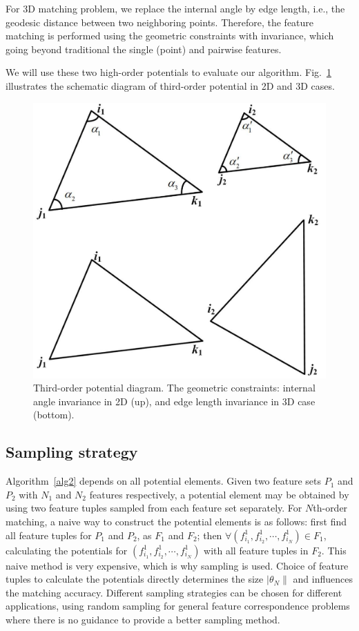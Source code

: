 For 3D matching problem, we replace the internal angle by edge length, i.e., the geodesic distance between two neighboring points. 
Therefore, the feature matching is performed using the geometric constraints with invariance, 
which going beyond traditional the single (point) and pairwise features.

We will use these two high-order potentials to evaluate our algorithm.
Fig.~\ref{fig:TO} illustrates the schematic diagram of third-order potential in 2D and 3D cases.

\begin{figure}
\centering
  \includegraphics[width=0.7\linewidth]{thirdorderpotentials.pdf}
  \caption{Third-order potential diagram. The geometric constraints: internal angle invariance in 2D (up), and edge length invariance in 3D case (bottom).}
\label{fig:TO}
\end{figure}

\subsection{Sampling strategy}
\label{subsec:sampling}

Algorithm~\ref{alg2} depends on all potential elements.
Given two feature sets $P_1$ and $P_2$ with $N_1$ and $N_2$ features respectively,
a potential element may be obtained by using two feature tuples sampled from each feature set separately.
For $N$th-order matching, a naive way to construct the potential elements is as follows:
first find all feature tuples for $P_1$ and $P_2$, as $F_1$ and $F_2$; then $\forall (f_{i_1}^1, f_{i_2}^1, \cdots, f_{i_N}^1)\in F_1$,
calculating the potentials for $(f_{i_1}^1, f_{i_2}^1, \cdots, f_{i_N}^1)$ with all feature tuples in $F_2$.
This naive method is very expensive, which is why sampling is used.
Choice of feature tuples to calculate the potentials directly determines the size $|\theta_N\|$ and influences the matching accuracy.
Different sampling strategies can be chosen for different applications,
using random sampling for general feature correspondence problems where there is no guidance to provide a better sampling method.

